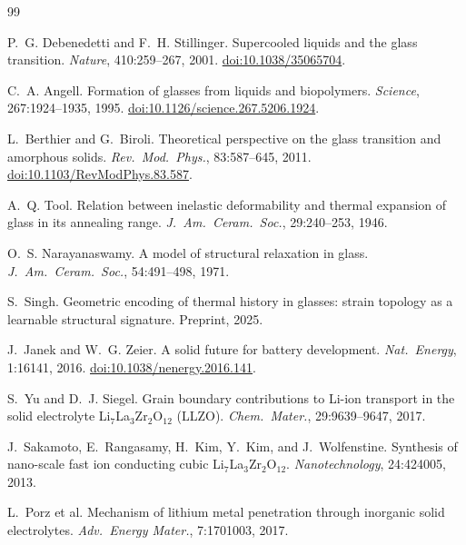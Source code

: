 \documentclass[12pt,a4paper]{article}
\newcommand{\doi}[1]{\href{https://doi.org/#1}{doi:#1}}
\begin{document}

\begin{thebibliography}{99}

P.~G. Debenedetti and F.~H. Stillinger.
\newblock Supercooled liquids and the glass transition.
\newblock \emph{Nature}, 410:259--267, 2001.
\newblock \doi{10.1038/35065704}.

C.~A. Angell.
\newblock Formation of glasses from liquids and biopolymers.
\newblock \emph{Science}, 267:1924--1935, 1995.
\newblock \doi{10.1126/science.267.5206.1924}.

L.~Berthier and G.~Biroli.
\newblock Theoretical perspective on the glass transition and amorphous solids.
\newblock \emph{Rev.~Mod.~Phys.}, 83:587--645, 2011.
\newblock \doi{10.1103/RevModPhys.83.587}.

A.~Q. Tool.
\newblock Relation between inelastic deformability and thermal expansion of glass in its annealing range.
\newblock \emph{J.~Am.~Ceram.~Soc.}, 29:240--253, 1946.

O.~S. Narayanaswamy.
\newblock A model of structural relaxation in glass.
\newblock \emph{J.~Am.~Ceram.~Soc.}, 54:491--498, 1971.

S.~Singh.
\newblock Geometric encoding of thermal history in glasses: strain topology as a learnable structural signature.
\newblock Preprint, 2025.

J.~Janek and W.~G. Zeier.
\newblock A solid future for battery development.
\newblock \emph{Nat.~Energy}, 1:16141, 2016.
\newblock \doi{10.1038/nenergy.2016.141}.

S.~Yu and D.~J. Siegel.
\newblock Grain boundary contributions to Li-ion transport in the solid electrolyte Li$_7$La$_3$Zr$_2$O$_{12}$ (LLZO).
\newblock \emph{Chem.~Mater.}, 29:9639--9647, 2017.

J.~Sakamoto, E.~Rangasamy, H.~Kim, Y.~Kim, and J.~Wolfenstine.
\newblock Synthesis of nano-scale fast ion conducting cubic Li$_7$La$_3$Zr$_2$O$_{12}$.
\newblock \emph{Nanotechnology}, 24:424005, 2013.

L.~Porz et al.
\newblock Mechanism of lithium metal penetration through inorganic solid electrolytes.
\newblock \emph{Adv.~Energy Mater.}, 7:1701003, 2017.


\end{thebibliography}
\end{document}
